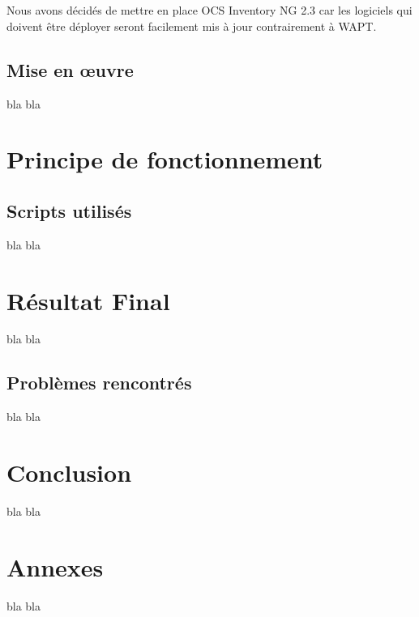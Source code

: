 \documentclass[11pt,a4paper,oneside]{article}
\begin{document}
\\ \\
Nous avons décidés de mettre en place OCS Inventory NG 2.3 car les logiciels qui doivent être déployer seront facilement mis à jour contrairement à WAPT.
\\
\subsection{Mise en \oe{}uvre}
bla bla
\\
\section{Principe de fonctionnement}
\subsection{Scripts utilis{\'e}s}
bla bla
\section{R{\'e}sultat Final}
bla bla
\subsection{Problèmes rencontr{\'e}s}
bla bla
\section{Conclusion}
bla bla
\section{Annexes}
bla bla
\end{document}
